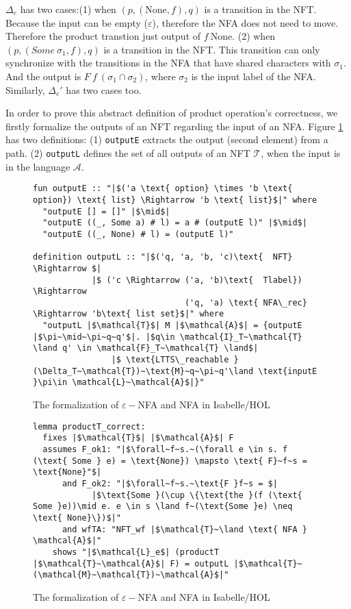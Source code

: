 \documentclass[a4paper,UKenglish,cleveref, autoref, thm-restate]{lipics-v2021}
\begin{document}
$\Delta_e$ has two cases:(1) when $(p, (\text{None}, f),  q)$ is a transition in the NFT. Because the input can be empty ($\varepsilon$), therefore the NFA does not need to move. Therefore the product transtion just output of $f~\text{None}$. (2) when $(p, (Some~\sigma_1, f), q)$ is a transition in the NFT. This transition can only synchronize with the transitions in the NFA that have shared characters with $\sigma_1$. And the output is $F~f~(\sigma_1\cap\sigma_2)$, where $\sigma_2$ is the input label of the NFA. Similarly, $\Delta_e'$ has two cases too.

In order to prove this abstract definition of product operation's correctness, we firstly formalize the outputs of an NFT regarding the input of an NFA. Figure \ref{fig-def-output} has two definitions: (1) \texttt{outputE} extracts the output (second element) from a path. (2) \texttt{outputL} defines the set of all outputs of an NFT $\mathcal{T}$, when the input is in the  language $\mathcal{A}$.


\begin{figure}[hbt!]
	\begin{lstlisting}
fun outputE :: "|$('a \text{ option} \times 'b \text{ option}) \text{ list} \Rightarrow 'b \text{ list}$|" where
  "outputE [] = []" |$\mid$|
  "outputE ((_, Some a) # l) = a # (outputE l)" |$\mid$|
  "outputE ((_, None) # l) = (outputE l)"

definition outputL :: "|$('q, 'a, 'b, 'c)\text{  NFT} \Rightarrow $|
            |$ ('c \Rightarrow ('a, 'b)\text{  Tlabel}) \Rightarrow 
                               ('q, 'a) \text{ NFA\_rec} \Rightarrow 'b\text{ list set}$|" where
  "outputL |$\mathcal{T}$| M |$\mathcal{A}$| = {outputE |$\pi~\mid~\pi~q~q'$|. |$q\in \mathcal{I}_T~\mathcal{T} \land q' \in \mathcal{F}_T~\mathcal{T} \land$|
                |$ \text{LTTS\_reachable }(\Delta_T~\mathcal{T})~\text{M}~q~\pi~q'\land \text{inputE }\pi\in \mathcal{L}~\mathcal{A}$|}" 
	\end{lstlisting}
\caption{The formalization of $\varepsilon-$NFA and NFA in Isabelle/HOL}
\label{fig-def-output}
\end{figure}


\begin{figure}[hbt!]
	\begin{lstlisting}
lemma productT_correct:
  fixes |$\mathcal{T}$| |$\mathcal{A}$| F
  assumes F_ok1: "|$\forall~f~s.~(\forall e \in s. f (\text{ Some } e) = \text{None}) \mapsto \text{ F}~f~s = \text{None}"$|
      and F_ok2: "|$\forall~f~s.~\text{F }f~s = $|
            |$\text{Some }(\cup \{\text{the }(f (\text{ Some }e))\mid e. e \in s \land f~(\text{Some }e) \neq \text{ None}\})$|"
      and wfTA: "NFT_wf |$\mathcal{T}~\land \text{ NFA } \mathcal{A}$|"
    shows "|$\mathcal{L}_e$| (productT |$\mathcal{T}~\mathcal{A}$| F) = outputL |$\mathcal{T}~(\mathcal{M}~\mathcal{T})~\mathcal{A}$|"

	\end{lstlisting}
\caption{The formalization of $\varepsilon-$NFA and NFA in Isabelle/HOL}
\label{fig-def-product-correct}
\end{figure}
\end{document}
